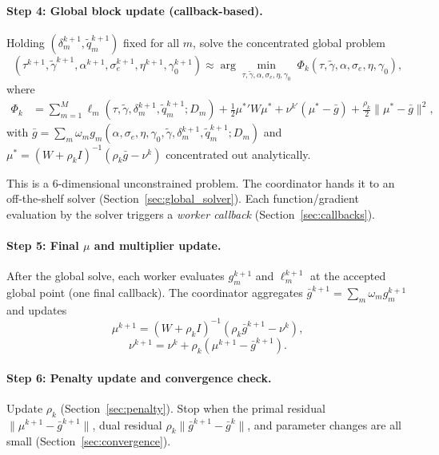 \documentclass[11pt]{article}
\begin{document}
\paragraph{Step 4: Global block update (callback-based).} Holding $(\delta_m^{k+1},\tilde q_m^{k+1})$ fixed for all $m$, solve the concentrated global problem
\begin{equation}\label{eq:global_problem}
(\tau^{k+1},\tilde\gamma^{k+1},\alpha^{k+1},\sigma_e^{k+1},\eta^{k+1},\gamma_0^{k+1}) \approx \arg\min_{\tau,\tilde\gamma,\alpha,\sigma_e,\eta,\gamma_0}\; \Phi_k(\tau,\tilde\gamma,\alpha,\sigma_e,\eta,\gamma_0),
\end{equation}
where
\begin{align}
\Phi_k &= \sum_{m=1}^M \ell_m(\tau,\tilde\gamma,\delta_m^{k+1},\tilde q_m^{k+1};D_m) + \frac{1}{2}\mu^*{}'W\mu^* + \nu^{k\prime}(\mu^*-\bar g) + \frac{\rho_k}{2}\|\mu^*-\bar g\|^2,
\label{eq:Phi}
\end{align}
with $\bar g = \sum_m \omega_m g_m(\alpha,\sigma_e,\eta,\gamma_0,\tilde\gamma,\delta_m^{k+1},\tilde q_m^{k+1};D_m)$ and $\mu^* = (W+\rho_k I)^{-1}(\rho_k\bar g - \nu^k)$ concentrated out analytically.

This is a 6-dimensional unconstrained problem. The coordinator hands it to an off-the-shelf solver (Section~\ref{sec:global_solver}). Each function/gradient evaluation by the solver triggers a \emph{worker callback} (Section~\ref{sec:callbacks}).

\paragraph{Step 5: Final $\mu$ and multiplier update.} After the global solve, each worker evaluates $g_m^{k+1}$ and $\ell_m^{k+1}$ at the accepted global point (one final callback). The coordinator aggregates $\bar g^{k+1} = \sum_m \omega_m g_m^{k+1}$ and updates
\begin{equation}\label{eq:mu_final}
\mu^{k+1} = (W+\rho_k I)^{-1}(\rho_k\bar g^{k+1}-\nu^k),
\end{equation}
\begin{equation}\label{eq:nu_update}
\nu^{k+1} = \nu^k + \rho_k(\mu^{k+1}-\bar g^{k+1}).
\end{equation}

\paragraph{Step 6: Penalty update and convergence check.} Update $\rho_k$ (Section~\ref{sec:penalty}). Stop when the primal residual $\|\mu^{k+1}-\bar g^{k+1}\|$, dual residual $\rho_k\|\bar g^{k+1}-\bar g^k\|$, and parameter changes are all small (Section~\ref{sec:convergence}).
\end{document}
